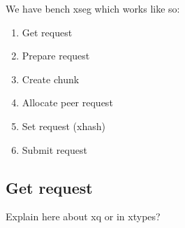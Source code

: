 We have bench xseg which works like so:

\begin{enumerate}
	\item Get request
	\item Prepare request
	\item Create chunk
	\item Allocate peer request
	\item Set request (xhash)
	\item Submit request
\end{enumerate}

\subsection{Get request}\label{sec:get-req-archip}

Explain here about xq or in xtypes?
